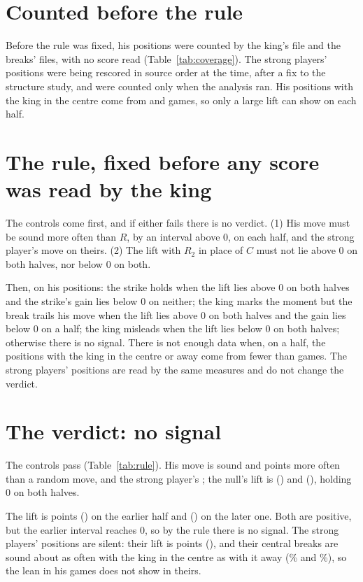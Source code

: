 \documentclass[11pt]{article}
\begin{document}
\section{Counted before the rule}

Before the rule was fixed, his positions were counted by the king's file and the breaks' files,
with no score read (Table~\ref{tab:coverage}). The strong players' positions were being rescored
in source order at the time, after a fix to the structure study, and were counted only when the
analysis ran. His positions with the king in the centre come from \CentreGamesFirst{} and
\CentreGamesSecond{} games, so only a large lift can show on each half.

\CoverageTable

\section{The rule, fixed before any score was read by the king}

The controls come first, and if either fails there is no verdict. (1) His move must be sound more
often than $R$, by an interval above 0, on each half, and the strong player's move on theirs.
(2) The lift with $R_2$ in place of $C$ must not lie above 0 on both halves, nor below 0 on both.

Then, on his positions: the strike holds when the lift lies above 0 on both halves and the
strike's gain lies below 0 on neither; the king marks the moment but the break trails his move
when the lift lies above 0 on both halves and the gain lies below 0 on a half; the king misleads
when the lift lies below 0 on both halves; otherwise there is no signal. There is not enough data
when, on a half, the positions with the king in the centre or away come from fewer than
\MinGames{} games. The strong players' positions are read by the same measures and do not change
the verdict.

\section{The verdict: no signal}

The controls pass (Table~\ref{tab:rule}). His move is sound \RefereeFirst{} and \RefereeSecond{}
points more often than a random move, and the strong player's \StrongReferee; the null's lift is
\NullFirst{} (\NullFirstCi) and \NullSecond{} (\NullSecondCi), holding 0 on both halves.

The lift is \LiftFirst{} points (\LiftFirstCi) on the earlier half and \LiftSecond{}
(\LiftSecondCi) on the later one. Both are positive, but the earlier interval reaches 0, so by the
rule there is no signal. The strong players' positions are silent: their lift is \StrongLift{}
points (\StrongLiftCi), and their central breaks are sound about as often with the king in the
centre as with it away (\StrongCCentre\% and \StrongCAway\%), so the lean in his games does not
show in theirs.
\end{document}
